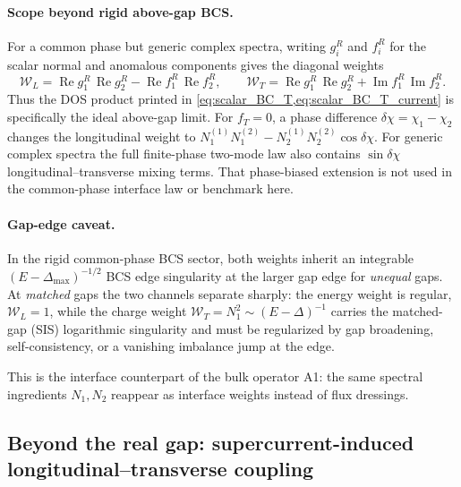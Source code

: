 \documentclass[
  aps,
  prb,
  preprint,
  superscriptaddress,
  longbibliography,
  nofootinbib
]{revtex4-2}
\newcommand{\DOS}{N_1}
\newcommand{\fT}{f_T}
\newcommand{\Real}{\operatorname{Re}}
\newcommand{\Imag}{\operatorname{Im}}
\begin{document}
\paragraph{Scope beyond rigid above-gap BCS.}
For a common phase but generic complex spectra, writing \(g_i^R\) and
\(f_i^R\) for the scalar normal and anomalous components gives the diagonal
weights
\[
  \mathcal W_L
  =
  \Real g_1^R\,\Real g_2^R
  -
  \Real f_1^R\,\Real f_2^R,
  \qquad
  \mathcal W_T
  =
  \Real g_1^R\,\Real g_2^R
  +
  \Imag f_1^R\,\Imag f_2^R .
\]
Thus the DOS product printed in
\cref{eq:scalar_BC_T,eq:scalar_BC_T_current} is specifically the ideal
above-gap limit. For \(\fT=0\), a phase difference
\(\delta\chi=\chi_1-\chi_2\) changes the longitudinal weight to
\(\DOS^{(1)}\DOS^{(2)}
-N_2^{(1)}N_2^{(2)}\cos\delta\chi\).
For generic complex spectra the full finite-phase two-mode law also contains
\(\sin\delta\chi\) longitudinal--transverse mixing terms. That phase-biased
extension is not used in the common-phase interface law or benchmark here.

\paragraph{Gap-edge caveat.} In the rigid common-phase BCS sector, both
weights inherit an integrable
\((E-\Delta_{\max})^{-1/2}\) BCS edge singularity at the larger gap edge
for \emph{unequal} gaps. At \emph{matched} gaps the two channels separate
sharply: the energy weight is regular, \(\mathcal W_L=1\), while the
charge weight \(\mathcal W_T=\DOS^2\sim(E-\Delta)^{-1}\) carries the
matched-gap (SIS) logarithmic singularity and must be regularized by gap
broadening, self-consistency, or a vanishing imbalance jump at the edge.

This is the interface counterpart of the bulk operator A1: the same spectral
ingredients \(\DOS,N_2\) reappear as interface weights instead of flux dressings.

\subsection{Beyond the real gap: supercurrent-induced longitudinal--transverse
coupling}
\label{app:supercurrent}
\end{document}
